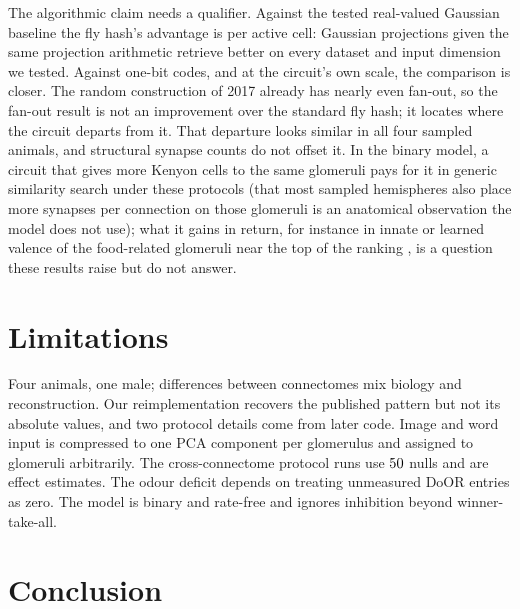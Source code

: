 \documentclass[conference]{IEEEtran}
\begin{document}
The algorithmic claim needs a qualifier. Against the tested real-valued Gaussian
baseline the fly hash's advantage is per active cell: Gaussian projections given the same projection arithmetic
retrieve better on every dataset and input dimension we tested. Against one-bit
codes, and at the circuit's own scale, the comparison is closer. The random construction of 2017 already has nearly even fan-out, so the
fan-out result is not an improvement over the standard fly hash; it locates
where the circuit departs from it. That departure looks similar in all four sampled animals, and structural synapse counts do not offset it. In the binary model, a circuit that gives more Kenyon cells to the same glomeruli pays for it in generic similarity search under these protocols (that most sampled hemispheres also place more synapses per connection on those glomeruli is an anatomical observation the model does not use); what it gains in return, for instance in innate or learned valence of the food-related glomeruli near the top of the ranking \cite{zheng2022}, is a question these results raise but do not answer.

\section{Limitations}

Four animals, one male; differences between connectomes mix biology and
reconstruction. Our reimplementation recovers the published pattern but not
its absolute values, and two protocol details come from later code. Image and
word input is compressed to one PCA component per glomerulus and assigned to
glomeruli arbitrarily. The cross-connectome protocol runs use $50$ nulls and are
effect estimates. The odour deficit depends on treating unmeasured DoOR entries
as zero. The model is binary and rate-free and ignores inhibition beyond
winner-take-all.

\section{Conclusion}
\end{document}
